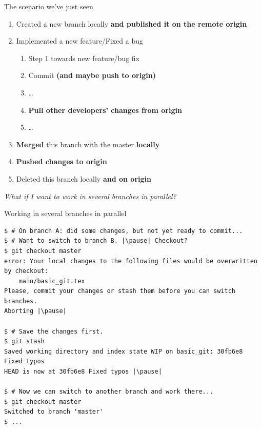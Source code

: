 \begin{frame}[fragile]{The scenario we've just seen}
	\begin{enumerate}
		\item Created a new branch locally \textbf{and published it on the remote origin}
		\item Implemented a new feature/Fixed a bug
		\begin{enumerate}
			\item Step 1 towards new feature/bug fix
			\item Commit \textbf{(and maybe push to origin)}
			\item \ldots
			\item \textbf{Pull other developers' changes from origin}
			\item \ldots
		\end{enumerate}
		\item \textbf{Merged} this branch with the master \textbf{locally}
		\item \textbf{Pushed changes to origin}
		\item Deleted this branch locally \textbf{and on origin}
	\end{enumerate}
	\pause
	\textit{What if I want to work in several branches in parallel?}
\end{frame}

\begin{frame}[fragile]{Working in several branches in parallel}
	\begin{tiny}
		\begin{lstlisting}
$ # On branch A: did some changes, but not yet ready to commit...
$ # Want to switch to branch B. |\pause| Checkout?
$ git checkout master
error: Your local changes to the following files would be overwritten by checkout:
	main/basic_git.tex
Please, commit your changes or stash them before you can switch branches.
Aborting |\pause|

$ # Save the changes first.
$ git stash
Saved working directory and index state WIP on basic_git: 30fb6e8 Fixed typos
HEAD is now at 30fb6e8 Fixed typos |\pause|

$ # Now we can switch to another branch and work there...
$ git checkout master
Switched to branch 'master'
$ ...
		\end{lstlisting}
	\end{tiny}
\end{frame}

